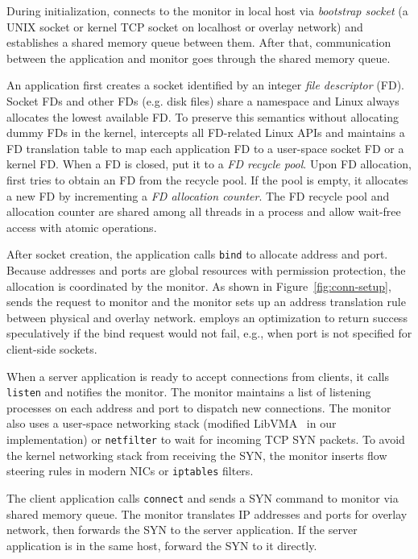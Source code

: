 During initialization, \libipc{} connects to the monitor in local host via \emph{bootstrap socket} (a UNIX socket or kernel TCP socket on localhost or overlay network) and establishes a shared memory queue between them.
After that, communication between the application and monitor goes through the shared memory queue.

An application first creates a socket identified by an integer \emph{file descriptor} (FD).
Socket FDs and other FDs (e.g. disk files) share a namespace and Linux always allocates the lowest available FD.
To preserve this semantics without allocating dummy FDs in the kernel, \libipc{} intercepts all FD-related Linux APIs and maintains a FD translation table to map each application FD to a user-space socket FD or a kernel FD.
When a FD is closed, \libipc{} put it to a \emph{FD recycle pool}.
Upon FD allocation, \libipc{} first tries to obtain an FD from the recycle pool.
If the pool is empty, it allocates a new FD by incrementing a \emph{FD allocation counter}.
The FD recycle pool and allocation counter are shared among all threads in a process and allow wait-free access with atomic operations.

After socket creation, the application calls \texttt{bind} to allocate address and port.
Because addresses and ports are global resources with permission protection, the allocation is coordinated by the monitor.
As shown in Figure~\ref{fig:conn-setup}, \libipc{} sends the request to monitor and the monitor sets up an address translation rule between physical and overlay network.
\libipc{} employs an optimization to return success speculatively if the bind request would not fail, e.g., when port is not specified for client-side sockets.

When a server application is ready to accept connections from clients, it calls \texttt{listen} and notifies the monitor.
The monitor maintains a list of listening processes on each address and port to dispatch new connections.
The monitor also uses a user-space networking stack (modified LibVMA~\cite{libvma} in our implementation) or \texttt{netfilter} to wait for incoming TCP SYN packets.
To avoid the kernel networking stack from receiving the SYN, the monitor inserts flow steering rules in modern NICs or \texttt{iptables} filters.

The client application calls \texttt{connect} and sends a SYN command to monitor via shared memory queue.
The monitor translates IP addresses and ports for overlay network, then forwards the SYN to the server application.
If the server application is in the same host, forward the SYN to it directly.

